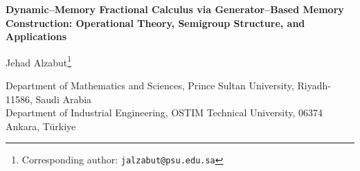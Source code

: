 \documentclass[11pt]{article}
\numberwithin{equation}{section}
\begin{document}
\begin{center} {\Large\bfseries 
Dynamic–Memory Fractional Calculus via Generator–Based Memory Construction:
Operational Theory, Semigroup Structure, and Applications
 \par} \vspace{0.8em} 

{\large
Jehad Alzabut\footnote{Corresponding author: \texttt{jalzabut@psu.edu.sa}} 

\par}

\vspace{0.3em}

{\footnotesize
Department of Mathematics and Sciences, Prince Sultan University, Riyadh-11586, Saudi Arabia\\
Department of Industrial Engineering, OSTIM Technical University, 06374 Ankara, T\"urkiye
\par}
\end{center} 
\end{document}
